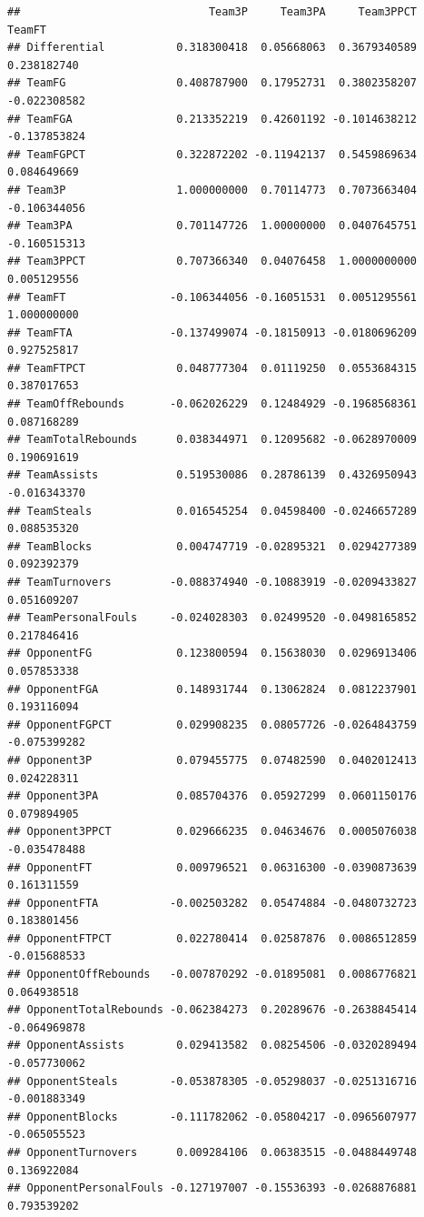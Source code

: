 \documentclass[]{book}
\begin{document}
\begin{verbatim}
##                             Team3P     Team3PA     Team3PPCT       TeamFT
## Differential           0.318300418  0.05668063  0.3679340589  0.238182740
## TeamFG                 0.408787900  0.17952731  0.3802358207 -0.022308582
## TeamFGA                0.213352219  0.42601192 -0.1014638212 -0.137853824
## TeamFGPCT              0.322872202 -0.11942137  0.5459869634  0.084649669
## Team3P                 1.000000000  0.70114773  0.7073663404 -0.106344056
## Team3PA                0.701147726  1.00000000  0.0407645751 -0.160515313
## Team3PPCT              0.707366340  0.04076458  1.0000000000  0.005129556
## TeamFT                -0.106344056 -0.16051531  0.0051295561  1.000000000
## TeamFTA               -0.137499074 -0.18150913 -0.0180696209  0.927525817
## TeamFTPCT              0.048777304  0.01119250  0.0553684315  0.387017653
## TeamOffRebounds       -0.062026229  0.12484929 -0.1968568361  0.087168289
## TeamTotalRebounds      0.038344971  0.12095682 -0.0628970009  0.190691619
## TeamAssists            0.519530086  0.28786139  0.4326950943 -0.016343370
## TeamSteals             0.016545254  0.04598400 -0.0246657289  0.088535320
## TeamBlocks             0.004747719 -0.02895321  0.0294277389  0.092392379
## TeamTurnovers         -0.088374940 -0.10883919 -0.0209433827  0.051609207
## TeamPersonalFouls     -0.024028303  0.02499520 -0.0498165852  0.217846416
## OpponentFG             0.123800594  0.15638030  0.0296913406  0.057853338
## OpponentFGA            0.148931744  0.13062824  0.0812237901  0.193116094
## OpponentFGPCT          0.029908235  0.08057726 -0.0264843759 -0.075399282
## Opponent3P             0.079455775  0.07482590  0.0402012413  0.024228311
## Opponent3PA            0.085704376  0.05927299  0.0601150176  0.079894905
## Opponent3PPCT          0.029666235  0.04634676  0.0005076038 -0.035478488
## OpponentFT             0.009796521  0.06316300 -0.0390873639  0.161311559
## OpponentFTA           -0.002503282  0.05474884 -0.0480732723  0.183801456
## OpponentFTPCT          0.022780414  0.02587876  0.0086512859 -0.015688533
## OpponentOffRebounds   -0.007870292 -0.01895081  0.0086776821  0.064938518
## OpponentTotalRebounds -0.062384273  0.20289676 -0.2638845414 -0.064969878
## OpponentAssists        0.029413582  0.08254506 -0.0320289494 -0.057730062
## OpponentSteals        -0.053878305 -0.05298037 -0.0251316716 -0.001883349
## OpponentBlocks        -0.111782062 -0.05804217 -0.0965607977 -0.065055523
## OpponentTurnovers      0.009284106  0.06383515 -0.0488449748  0.136922084
## OpponentPersonalFouls -0.127197007 -0.15536393 -0.0268876881  0.793539202

\end{verbatim}
\end{document}

